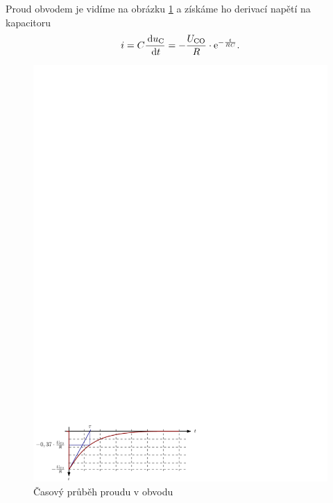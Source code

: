 Proud obvodem je vidíme na obrázku \ref{fig:prvni_rad_rc_graf_i} a získáme ho derivací napětí na kapacitoru
$$
i = C \frac{\,\mathrm{d} u_\mathrm{C}}{\,\mathrm{d} t} = - \frac{U_\mathrm{CO}}{R} \cdot \mathrm{e}^{-\frac{t}{RC}}.
$$
\begin{figure}[h!]
\centering
\includegraphics[]{prechodne_jevy/prvni_rad/rc_graf_i.pdf}
\caption{Časový průběh proudu v obvodu}
\label{fig:prvni_rad_rc_graf_i}
\end{figure}

